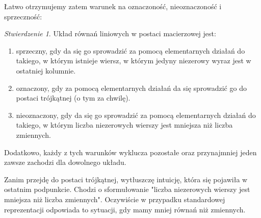 \documentclass{article}
\theoremstyle{remark}
\newtheorem{lemma}{Stwierdzenie}[subsubsection]
\begin{document}
Łatwo otrzymujemy zatem warunek na oznaczoność, nieoznaczoność i sprzeczność:
\begin{lemma}
  Układ równań liniowych w postaci macierzowej jest:
  \begin{enumerate}
    \item sprzeczny, gdy da się go sprowadzić za pomocą elementarnych działań do takiego,
    w którym istnieje wiersz, w którym jedyny niezerowy wyraz jest w ostatniej kolumnie.
    \item oznaczony, gdy za pomocą elementarnych działań da się sprowadzić go do postaci
    trójkątnej (o tym za chwilę).
    \item nieoznaczony, gdy da się go sprowadzić za pomocą elementarnych działań do takiego,
    w którym liczba niezerowych wierszy jest mniejsza niż liczba zmiennych.
  \end{enumerate}
  Dodatkowo, każdy z tych warunków wyklucza pozostałe oraz przynajmniej
  jeden zawsze zachodzi dla dowolnego układu.
\end{lemma}
Zanim przejdę do postaci trójkątnej, wytłuszczę intuicję, która się pojawiła w ostatnim
podpunkcie. Chodzi o sformułowanie "liczba niezerowych wierszy jest mniejsza niż liczba zmiennych".
Oczywiście w przypadku standardowej reprezentacji odpowiada to sytuacji, gdy 
mamy mniej równań niż zmiennych.
\end{document}
